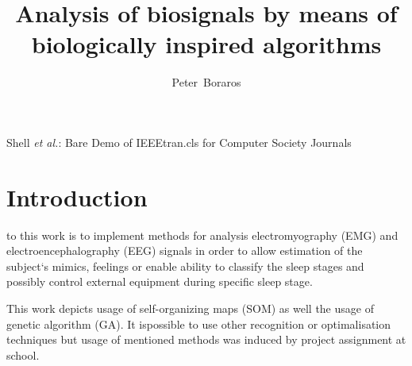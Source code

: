 \documentclass[a4paper]{IEEEtran}
\begin{document}
\title{Analysis of biosignals by means of\\ biologically inspired algorithms}

\author{Peter~Boraros%
}



%
{Shell \MakeLowercase{\textit{et al.}}: Bare Demo of IEEEtran.cls for Computer Society Journals}


\maketitle
\IEEEdisplaynotcompsoctitleabstractindextext
\IEEEpeerreviewmaketitle


\section{Introduction}
 to this work is to implement methods for analysis 
electromyography (EMG) and electroencephalography (EEG) 
signals in order to allow estimation of the subject`s mimics, 
feelings or enable ability to classify the sleep stages and possibly control 
external equipment during specific sleep stage.

This work depicts usage of self-organizing maps (SOM) as well the usage of genetic
algorithm (GA). It ispossible to use other recognition or optimalisation
techniques but usage of mentioned 
methods was induced by project assignment at school.

\end{document}
